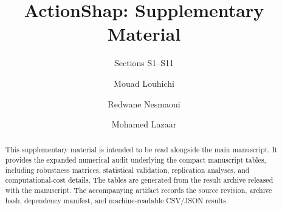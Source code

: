 \documentclass[manuscript,screen,anonymous]{acmart}
\begin{document}
\title{ActionShap: Supplementary Material}
\subtitle{Sections S1--S11}

\author{Mouad Louhichi}

\author{Redwane Nesmaoui}

\author{Mohamed Lazaar}

\makeatletter
\newif\ifreviewcopy
\reviewcopytrue
\newcommand{\authorsforreview}{Anonymous Author(s)}
  {\reviewcopytrue}
  {\reviewcopyfalse\renewcommand{\authorsforreview}{Louhichi et al.}}
\makeatother
\renewcommand{\shortauthors}{\authorsforreview}

\begin{abstract}
This supplementary material is intended to be read alongside the main manuscript. It provides the expanded numerical audit underlying the compact manuscript tables, including robustness matrices, statistical validation, replication analyses, and computational-cost details. The tables are generated from the result archive released with the manuscript. The accompanying artifact records the source revision, archive hash, dependency manifest, and machine-readable CSV/JSON results.
\end{abstract}



\maketitle
\end{document}
